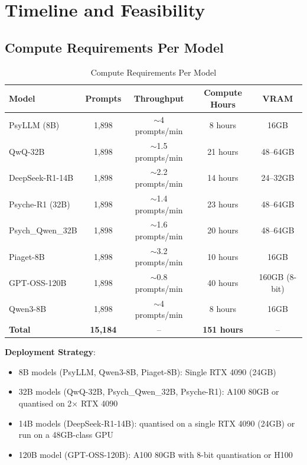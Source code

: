 \documentclass[11pt,a4paper]{article}
\begin{document}
\section{Timeline and Feasibility}

\subsection{Compute Requirements Per Model}

\begin{table}[H]
\centering
\caption{Compute Requirements Per Model}
\begin{tabularx}{\textwidth}{@{}lcccc@{}}
\toprule
\textbf{Model} & \textbf{Prompts} & \textbf{Throughput} & \textbf{Compute Hours} & \textbf{VRAM} \\
\midrule
PsyLLM (8B) & 1,898 & $\sim$4 prompts/min & 8 hours & 16GB \\
QwQ-32B & 1,898 & $\sim$1.5 prompts/min & 21 hours & 48--64GB \\
DeepSeek-R1-14B & 1,898 & $\sim$2.2 prompts/min & 14 hours & 24--32GB \\
Psyche-R1 (32B) & 1,898 & $\sim$1.4 prompts/min & 23 hours & 48--64GB \\
Psych\_Qwen\_32B & 1,898 & $\sim$1.6 prompts/min & 20 hours & 48--64GB \\
Piaget-8B & 1,898 & $\sim$3.2 prompts/min & 10 hours & 16GB \\
GPT-OSS-120B & 1,898 & $\sim$0.8 prompts/min & 40 hours & 160GB (8-bit) \\
Qwen3-8B & 1,898 & $\sim$4 prompts/min & 8 hours & 16GB \\
\midrule
\textbf{Total} & \textbf{15,184} & -- & \textbf{151 hours} & -- \\
\bottomrule
\end{tabularx}
\end{table}

\textbf{Deployment Strategy}: 
\begin{itemize}
    \item 8B models (PsyLLM, Qwen3-8B, Piaget-8B): Single RTX 4090 (24GB)
    \item 32B models (QwQ-32B, Psych\_Qwen\_32B, Psyche-R1): A100 80GB or quantised on 2$\times$ RTX 4090
    \item 14B models (DeepSeek-R1-14B): quantised on a single RTX 4090 (24GB) or run on a 48GB-class GPU
    \item 120B model (GPT-OSS-120B): A100 80GB with 8-bit quantisation or H100
\end{itemize}
\end{document}
